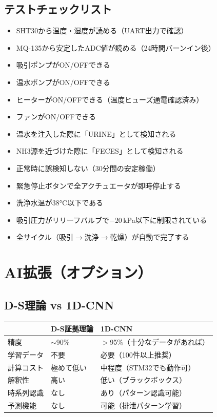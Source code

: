 \documentclass[a4paper,11pt]{article}
\begin{document}
\subsection{テストチェックリスト}

\begin{checklistbox}
\begin{itemize}[leftmargin=1.5em, label=$\square$]
  \item SHT30から温度・湿度が読める（UART出力で確認）
  \item MQ-135から安定したADC値が読める（24時間バーンイン後）
  \item 吸引ポンプがON/OFFできる
  \item 温水ポンプがON/OFFできる
  \item ヒーターがON/OFFできる（温度ヒューズ通電確認済み）
  \item ファンがON/OFFできる
  \item 温水を注入した際に「URINE」として検知される
  \item NH3源を近づけた際に「FECES」として検知される
  \item 正常時に誤検知しない（30分間の安定稼働）
  \item 緊急停止ボタンで全アクチュエータが即時停止する
  \item 洗浄水温が38°C以下である
  \item 吸引圧力がリリーフバルブで$-20$\,kPa以下に制限されている
  \item 全サイクル（吸引$\to$洗浄$\to$乾燥）が自動で完了する
\end{itemize}
\end{checklistbox}

\newpage
\section{AI拡張（オプション）}

\subsection{D-S理論 vs 1D-CNN}

\begin{center}
\begin{tabular}{lll}
\toprule
& \textbf{D-S証拠理論} & \textbf{1D-CNN} \\
\midrule
精度         & $\sim$90\%     & $>$95\%（十分なデータがあれば） \\
学習データ   & 不要           & 必要（100件以上推奨） \\
計算コスト   & 極めて低い     & 中程度（STM32でも動作可） \\
解釈性       & 高い           & 低い（ブラックボックス） \\
時系列認識   & なし           & あり（パターン認識可能） \\
予測機能     & なし           & 可能（排泄パターン学習） \\
\bottomrule
\end{tabular}
\end{center}
\end{document}
